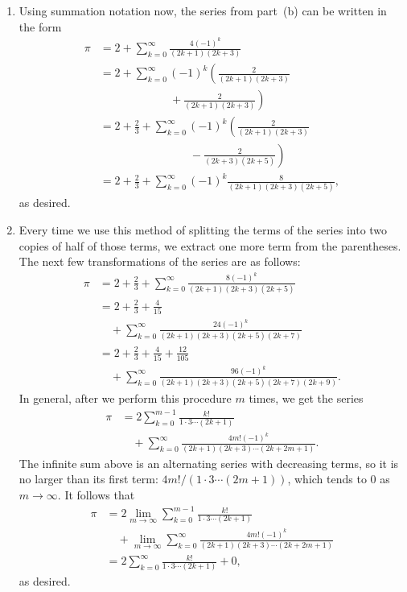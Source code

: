 \begin{multicols}{2}
\begin{itemize}[leftmargin=0em]
\begin{enumerate}[leftmargin=1.5em,label=\bf\color{ocre}(\alph*)]
			\item Using summation notation now, the series from part~(b) can be written in the form
			\begin{align*}
				\pi & = 2 + \sum_{k=0}^\infty \frac{4(-1)^k}{(2k+1)(2k+3)} \\
				& = 2 + \sum_{k=0}^\infty (-1)^k\left(\frac{2}{(2k+1)(2k+3)}\right. \\
				& \qquad \qquad \qquad \ {} + \left.\frac{2}{(2k+1)(2k+3)}\right) \\
				& = 2 + \frac{2}{3} + \sum_{k=0}^\infty (-1)^k\left(\frac{2}{(2k+1)(2k+3)}\right. \\
				& \qquad \qquad \qquad \qquad {} - \left.\frac{2}{(2k+3)(2k+5)}\right) \\
				& = 2 + \frac{2}{3} + \sum_{k=0}^\infty (-1)^k\frac{8}{(2k+1)(2k+3)(2k+5)},
			\end{align*}
			as desired.
			
			\item Every time we use this method of splitting the terms of the series into two copies of half of those terms, we extract one more term from the parentheses. The next few transformations of the series are as follows:
			\begin{align*}
				\pi & = 2 + \frac{2}{3} + \sum_{k=0}^\infty \frac{8(-1)^k}{(2k+1)(2k+3)(2k+5)} \\
				& = 2 + \frac{2}{3} + \frac{4}{15} \\
				& \quad + \sum_{k=0}^\infty \frac{24(-1)^k}{(2k+1)(2k+3)(2k+5)(2k+7)} \\
				& = 2 + \frac{2}{3} + \frac{4}{15} + \frac{12}{105} \\
				& \quad + \sum_{k=0}^\infty \frac{96(-1)^k}{(2k+1)(2k+3)(2k+5)(2k+7)(2k+9)}.
			\end{align*}
			In general, after we perform this procedure $m$ times, we get the series
			\begin{align*}
				\pi & = 2\sum_{k=0}^{m-1} \frac{k!}{1\cdot 3 \cdots (2k+1)} \\
				& \quad + \sum_{k=0}^\infty \frac{4m!(-1)^k}{(2k+1)(2k+3)\cdots(2k+2m+1)}.
			\end{align*}
			The infinite sum above is an alternating series with decreasing terms, so it is no larger than its first term: $4m!/(1\cdot 3 \cdots (2m+1))$, which tends to $0$ as $m\rightarrow\infty$. It follows that
			\begin{align*}
				\pi & = 2\lim_{m\rightarrow\infty} \sum_{k=0}^{m-1} \frac{k!}{1\cdot 3 \cdots (2k+1)} \\
				& \quad + \lim_{m\rightarrow\infty}\sum_{k=0}^\infty \frac{4m!(-1)^k}{(2k+1)(2k+3)\cdots(2k+2m+1)} \\
				& = 2\sum_{k=0}^\infty \frac{k!}{1\cdot 3 \cdots (2k+1)} + 0,
			\end{align*}
			as desired.
			

\end{enumerate}
\end{itemize}
\end{multicols}
